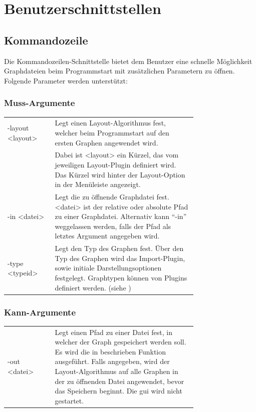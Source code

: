 \chapter{Benutzerschnittstellen}

\section{Kommandozeile}\label{sec:uicmd}

Die Kommandozeilen-Schnittstelle bietet dem Benutzer eine schnelle Möglichkeit Graphdateien beim Programmstart mit zusätzlichen Parametern zu öffnen.
Folgende Parameter werden unterstützt:\\
\subsection{Muss-Argumente}
\begin{tabular}{lp{0.75\linewidth}}
  -layout <layout> & Legt einen Layout-Algorithmus fest, welcher beim Programmstart auf den ersten Graphen angewendet wird.\\
    & Dabei ist <layout> ein Kürzel, das vom jeweiligen Layout-Plugin definiert wird. Das Kürzel wird hinter der Layout-Option in der Menüleiste angezeigt.\\
  -in <datei> & Legt die zu öffnende Graphdatei fest. <datei> ist der relative oder absolute Pfad zu einer Graphdatei. Alternativ kann ``-in'' weggelassen werden, falls der Pfad als letztes Argument angegeben wird.\\
  -type <typeid> & Legt den Typ des Graphen fest. Über den Typ des Graphen wird das Import-Plugin, sowie initiale Darstellungsoptionen festgelegt. Graphtypen können von Plugins definiert werden. (siehe ) %
\end{tabular}

\subsection{Kann-Argumente}
\begin{tabular}{lp{0.75\linewidth}}
  -out <datei> & Legt einen Pfad zu einer Datei fest, in welcher der Graph gespeichert werden soll.
  Es wird die in %
  beschrieben Funktion ausgeführt.
  Falls angegeben, wird der Layout-Algorithmus auf alle Graphen in der zu öffnenden Datei angewendet, bevor das Speichern beginnt.
  Die \gls{gui} wird nicht gestartet.
\end{tabular}

